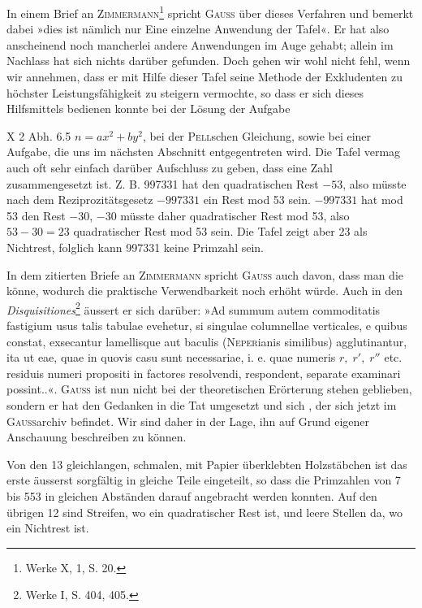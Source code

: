 In einem Brief an \textsc{Zimmermann}\footnote{Werke X, 1, S. 20.} spricht \textsc{Gauss} über dieses Verfahren und
bemerkt dabei »dies ist nämlich nur Eine einzelne Anwendung der Tafel«. Er
hat also anscheinend noch mancherlei andere Anwendungen im Auge gehabt;
allein im Nachlass hat sich nichts darüber gefunden. Doch gehen wir wohl
nicht fehl, wenn wir annehmen, dass er mit Hilfe dieser Tafel seine Methode
der Exkludenten zu höchster Leistungsfähigkeit zu steigern vermochte, so dass
er sich dieses Hilfsmittels bedienen konnte bei der Lösung der Aufgabe
\par\noindent X 2 Abh. 6.\hfill 5
\clearpage{}
\setcounter{footnote}{0}
\noindent $n=ax^2+by^2$, bei der \textsc{Pell}schen Gleichung, sowie bei einer Aufgabe, die
uns im nächsten Abschnitt entgegentreten wird. Die Tafel vermag auch oft
sehr einfach darüber Aufschluss zu geben, dass eine Zahl zusammengesetzt
ist. Z. B. 997331 hat den quadratischen Rest $-53$, also müsste nach dem
Reziprozitätsgesetz $-997331$ ein Rest mod 53 sein. $-997331$ hat mod 53 den
Rest $-30$, $-30$ müsste daher quadratischer Rest mod 53, also $53-30=23$
quadratischer Rest mod 53 sein. Die Tafel zeigt aber 23 als Nichtrest, folglich kann 997331 keine Primzahl sein.

In dem zitierten Briefe an \textsc{Zimmermann} spricht \textsc{Gauss} auch davon, dass
man die  könne, wodurch
die praktische Verwendbarkeit noch erhöht würde. Auch in den \textit{Disquisitiones}\footnote{Werke I, S. 404, 405.}
äussert er sich darüber: »Ad summum autem commoditatis fastigium usus talis
tabulae evehetur, si singulae columnellae verticales, e quibus constat, exsecantur
lamellisque aut baculis (\textsc{Neper}ianis similibus) agglutinantur, ita ut eae, quae
in quovis casu sunt necessariae, i. e. quae numeris $r,\;r',\;r''$ etc. residuis numeri propositi in factores resolvendi, respondent, separate examinari possint..«.
\textsc{Gauss} ist nun nicht bei der theoretischen Erörterung stehen geblieben, sondern er hat den Gedanken in die Tat umgesetzt und sich , der sich jetzt im \textsc{Gauss}archiv befindet. Wir
sind daher in der Lage, ihn auf Grund eigener Anschauung beschreiben zu
können.

Von den 13 gleichlangen, schmalen, mit Papier überklebten Holzstäbchen
ist das erste äusserst sorgfältig in gleiche Teile eingeteilt, so dass die Primzahlen von 7 bis 553 in gleichen Abständen darauf angebracht werden konnten.
Auf den übrigen 12 sind Streifen, wo ein quadratischer Rest ist, und leere
Stellen da, wo ein Nichtrest ist.

